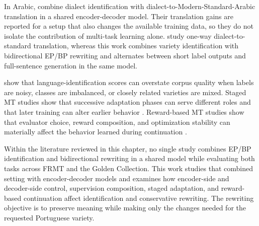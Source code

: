 In Arabic, \citet{khered-etal-2025-multi} combine dialect identification with
dialect-to-Modern-Standard-Arabic translation in a shared encoder-decoder
model. Their translation gains are reported for a setup that also changes the
available training data, so they do not isolate the contribution of multi-task
learning alone. \citet{khered-etal-2025-multi} study one-way dialect-to-standard translation,
whereas this work combines variety identification with bidirectional EP/BP
rewriting and alternates between short label outputs and full-sentence
generation in the same model.

\citet{caswell-etal-2020-language-id-wild} show that language-identification
scores can overstate corpus quality when labels are noisy, classes are
imbalanced, or closely related varieties are mixed. Staged MT studies show
that successive adaptation phases can serve different roles and that later
training can alter earlier behavior
\citep{alves2024toweropenmultilingual,rei2025towerbridginggenerality,omnilingualmtteam2026omnilingualmtmachinetranslation}.
Reward-based MT studies show that evaluator choice, reward composition, and
optimization stability can materially affect the behavior learned during
continuation
\citep{he-etal-2024-improving,feng2025mtr1zero,pmlr-v235-wang24ay}.

Within the literature reviewed in this chapter, no single study combines EP/BP
identification and bidirectional rewriting in a shared model while evaluating
both tasks across FRMT and the Golden Collection. This work studies that
combined setting with encoder-decoder models and examines how encoder-side and
decoder-side control, supervision composition, staged adaptation, and
reward-based continuation affect identification and conservative rewriting.
The rewriting objective is to preserve meaning while making only the changes
needed for the requested Portuguese variety.
